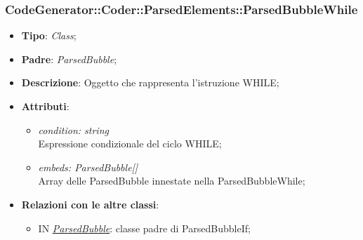 \documentclass[../DefinizioneDiProdotto.tex]{subfiles}
\begin{document}
			\subsubsection{CodeGenerator::Coder::ParsedElements::ParsedBubbleWhile}
			\hypertarget{SWEDesigner::Server::CodeGenerator::Coder::ParsedElements::ParsedBubbleWhile}{}
			\begin{itemize}
				\item \textbf{Tipo}: \emph{Class};
				\item \textbf{Padre}: \emph{ParsedBubble};
				\item \textbf{Descrizione}: Oggetto che rappresenta l'istruzione WHILE;
				\item \textbf{Attributi}:
				\begin{itemize}
					\item \emph{condition: string} \\
					Espressione condizionale del ciclo WHILE;
					\item \emph{embeds: ParsedBubble[]} \\
					Array delle ParsedBubble innestate nella ParsedBubbleWhile;
				\end{itemize}
				\item \textbf{Relazioni con le altre classi}:	
				\begin{itemize}
					\item IN \hyperlink{SWEDesigner::Server::CodeGenerator::Coder::ParsedElements::ParsedBubble}{\emph{ParsedBubble}}: classe padre di ParsedBubbleIf; 
				\end{itemize}
			\end{itemize}
		
\end{document}
